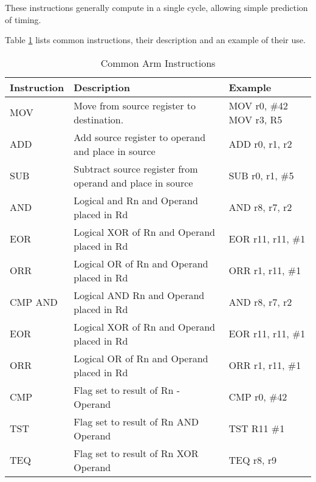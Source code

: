 				These instructions generally compute in a single cycle, allowing simple prediction of timing. 

				Table \ref{tab:ARMInstructions} lists common instructions, their description and an example of their use. 
				\begin{table}[htb]
					\centering 
					\begin{tabular}{|l|p{6cm}|p{3cm}|}
						\hline
						\textbf{Instruction} & \textbf{Description} & \textbf{Example} \\ \hline
						MOV & Move from source register to destination. & MOV r0, \#42\, MOV r3, R5 \\ \hline
						ADD & Add source register to operand and place in source & ADD r0, r1, r2 \\ \hline
						SUB & Subtract source register from operand and place in source & SUB r0, r1, \#5 \\ \hline
						AND & Logical and Rn and Operand placed in Rd & AND r8, r7, r2 \\ \hline 
						EOR & Logical XOR of Rn and Operand placed in Rd & EOR r11, r11, \#1 \\ \hline
						ORR & Logical OR of Rn and Operand placed in Rd & ORR r1, r11, \#1 \\ \hline 
						CMP AND & Logical AND Rn and Operand placed in Rd & AND r8, r7, r2 \\ \hline 
						EOR & Logical XOR of Rn and Operand placed in Rd & EOR r11, r11, \#1 \\ \hline
						ORR & Logical OR of Rn and Operand placed in Rd & ORR r1, r11, \#1 \\ \hline 
						CMP & Flag set to result of Rn - Operand & CMP r0, \#42 \\ \hline
						TST & Flag set to result of Rn AND Operand & TST R11 \#1 \\ \hline
						TEQ & Flag set to result of Rn XOR Operand & TEQ r8, r9 \\ \hline
					\end{tabular}
					\caption{Common Arm Instructions}
					\label{tab:ARMInstructions}
				\end{table}

